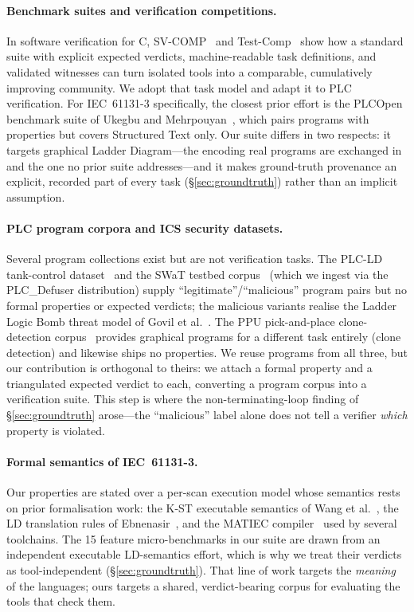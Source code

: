 \paragraph{Benchmark suites and verification competitions.}
In software verification for C, SV-COMP~\cite{svcomp} and Test-Comp~\cite{testcomp} show how a
standard suite with explicit expected verdicts, machine-readable task definitions, and validated
witnesses can turn isolated tools into a comparable, cumulatively improving community. We adopt
that task model and adapt it to PLC verification. For IEC~61131-3 specifically, the closest prior
effort is the PLCOpen benchmark suite of Ukegbu and Mehrpouyan~\cite{plcopensuite}, which pairs
programs with properties but covers Structured Text only. Our suite differs in two respects: it
targets graphical Ladder Diagram---the encoding real programs are exchanged in and the one no
prior suite addresses---and it makes ground-truth provenance an explicit, recorded part of every
task (\S\ref{sec:groundtruth}) rather than an implicit assumption.

\paragraph{PLC program corpora and ICS security datasets.}
Several program collections exist but are not verification tasks. The PLC-LD tank-control
dataset~\cite{plcld} and the SWaT testbed corpus~\cite{swat} (which we ingest via the
PLC\_Defuser distribution) supply ``legitimate''/``malicious'' program pairs but no formal
properties or expected verdicts; the malicious variants realise the Ladder Logic Bomb threat
model of Govil et al.~\cite{llb}. The PPU pick-and-place clone-detection corpus~\cite{ppu}
provides graphical programs for a different task entirely (clone detection) and likewise ships no
properties. We reuse programs from all three, but our contribution is orthogonal to theirs: we
attach a formal property and a triangulated expected verdict to each, converting a program corpus
into a verification suite. This step is where the non-terminating-loop finding of
\S\ref{sec:groundtruth} arose---the ``malicious'' label alone does not tell a verifier
\emph{which} property is violated.

\paragraph{Formal semantics of IEC~61131-3.}
Our properties are stated over a per-scan execution model whose semantics rests on prior
formalisation work: the K-ST executable semantics of Wang et al.~\cite{kst}, the LD translation
rules of Ebnenasir~\cite{ebnenasir}, and the MATIEC compiler~\cite{matiec} used by several
toolchains. The 15 feature micro-benchmarks in our suite are drawn from an independent executable
LD-semantics effort, which is why we treat their verdicts as tool-independent
(\S\ref{sec:groundtruth}). That line of work targets the \emph{meaning} of the languages; ours
targets a shared, verdict-bearing corpus for evaluating the tools that check them.


